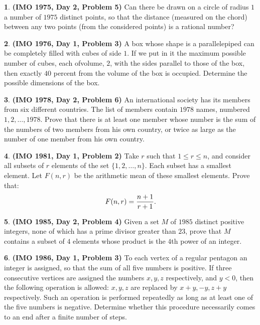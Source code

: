 \documentclass{article}
\theoremstyle{definition}
\newtheorem{p}{}
\begin{document}
\begin{p}{\bf (IMO 1975, Day 2, Problem 5)}
Can there be drawn on a circle of radius $1$ a number of $1975$ distinct points, so that the distance (measured on the chord) between any two points (from the considered points) is a rational number?
\end{p}



\begin{p}{\bf (IMO 1976, Day 1, Problem 3)}
A box whose shape is a parallelepiped can be completely filled with cubes of side $1.$ If we put in it the maximum possible number of cubes, each ofvolume, $2$, with the sides parallel to those of the box, then exactly $40$ percent from the volume of the box is occupied. Determine the possible dimensions of the box.
\end{p}




\begin{p}{\bf (IMO 1978, Day 2, Problem 6)}
An international society has its members from six different countries.  The list of members contain $1978$ names, numbered $1, 2, \dots, 1978$.  Prove that there is at least one member whose number is the sum of the numbers of two members from his own country, or twice as large as the number of one member from his own country.
\end{p}







\begin{p}{\bf (IMO 1981, Day 1, Problem 2)}
Take $r$ such that $1\le r\le n$, and consider all subsets of $r$ elements of the set $\{1,2,\ldots,n\}$. Each subset has a smallest element. Let $F(n,r)$ be the arithmetic mean of these smallest elements. Prove that: \[ F(n,r)={n+1\over r+1}. \]
\end{p}




\begin{p}{\bf (IMO 1985, Day 2, Problem 4)}
Given a set $M$ of $1985$ distinct positive integers, none of which has a prime divisor greater than $23$, prove that $M$ contains a subset of $4$ elements whose product is the $4$th power of an integer.
\end{p}



\begin{p}{\bf (IMO 1986, Day 1, Problem 3)}
To each vertex of a regular pentagon an integer is assigned, so that the sum of all five numbers is positive. If three consecutive vertices are assigned the numbers $x,y,z$ respectively, and $y<0$, then the following operation is allowed: $x,y,z$ are replaced by $x+y,-y,z+y$ respectively. Such an operation is performed repeatedly as long as at least one of the five numbers is negative. Determine whether this procedure necessarily comes to an end after a finite number of steps.
\end{p}
\end{document}

